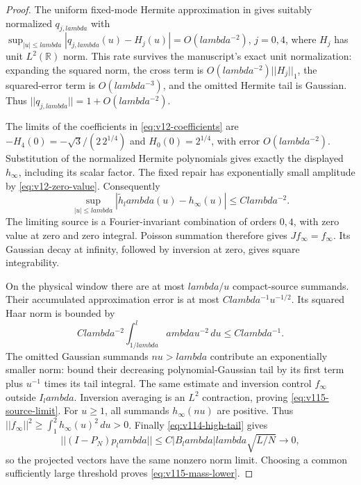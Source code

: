 \documentclass[11pt]{article}
\def\lambda{lambda}%
\def\norm#1{||#1||}%
\theoremstyle{remark}
\newcommand{\norm}[1]{\left\lVert #1\right\rVert}
\begin{document}
\begin{proof}
The uniform fixed-mode Hermite approximation in
\cite[Lemma~7.2]{ConnesConsaniMoscovici2025} gives suitably normalized
$q_{j,\lambda}$ with
$\sup_{|u|\le\lambda}|q_{j,\lambda}(u)-H_j(u)|=O(\lambda^{-2})$,
$j=0,4$, where $H_j$ has unit $L^2(\mathbb R)$ norm. This rate survives
the manuscript's exact unit normalization: expanding the squared norm,
the cross term is $O(\lambda^{-2})\norm{H_j}_1$, the squared-error term
is $O(\lambda^{-3})$, and the omitted Hermite tail is Gaussian.
Thus $\norm{q_{j,\lambda}}=1+O(\lambda^{-2})$.

The limits of the coefficients in \eqref{eq:v12-coefficients} are
$-H_4(0)=-\sqrt3/(2\,2^{1/4})$ and $H_0(0)=2^{1/4}$, with error
$O(\lambda^{-2})$. Substitution of the normalized Hermite polynomials
gives exactly the displayed $h_\infty$, including its scalar factor.
The fixed repair has exponentially small amplitude by
\eqref{eq:v12-zero-value}. Consequently
\[
 \sup_{|u|\le\lambda}|\widetilde h_\lambda(u)-h_\infty(u)|
       \le C\lambda^{-2}.
\]
The limiting source is a Fourier-invariant combination of orders $0,4$,
with zero value at zero and zero integral. Poisson summation therefore
gives $Jf_\infty=f_\infty$. Its Gaussian decay at infinity, followed by
inversion at zero, gives square integrability.

On the physical window there are at most $\lambda/u$ compact-source
summands. Their accumulated approximation error is at most
$C\lambda^{-1}u^{-1/2}$. Its squared Haar norm is bounded by
\[
 C\lambda^{-2}\int_{1/\lambda}^\lambda u^{-2}\,du
       \le C\lambda^{-1}.
\]
The omitted Gaussian summands $nu>\lambda$ contribute an exponentially
smaller norm: bound their decreasing polynomial-Gaussian tail by its
first term plus $u^{-1}$ times its tail integral. The same estimate and
inversion control $f_\infty$ outside $I_\lambda$. Inversion averaging
is an $L^2$ contraction, proving \eqref{eq:v115-source-limit}.
For $u\ge1$, all summands $h_\infty(nu)$ are positive. Thus
$\norm{f_\infty}^2\ge\int_1^2h_\infty(u)^2\,du>0$.
Finally \eqref{eq:v114-high-tail} gives
\[
 \norm{(I-P_N)p_\lambda}
       \le C|B_\lambda|\lambda\sqrt{L/N}\longrightarrow0,
\]
so the projected vectors have the same nonzero norm limit. Choosing a
common sufficiently large threshold proves \eqref{eq:v115-mass-lower}.
\end{proof}
\end{document}
